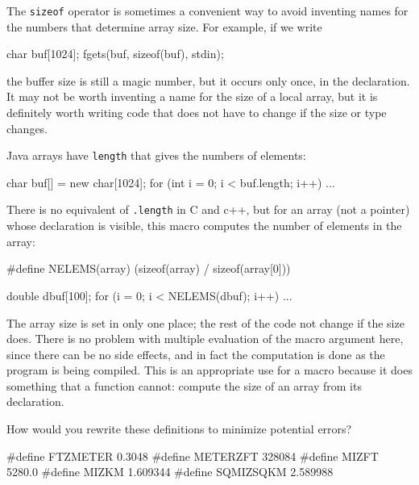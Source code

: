 The \verb'sizeof' operator is sometimes a convenient way to avoid inventing
names for the numbers that determine array size. For example, if we write 
\begin{wellcode}
    char    buf[1024];
    fgets(buf, sizeof(buf), stdin);
\end{wellcode}
the buffer size is still a magic number, but it occurs only once, in the
declaration. It may not be worth inventing a name for the size of a local
array, but it is definitely worth writing code that does not have to change
if the size or type changes.

Java arrays have \verb'length' that gives the numbers of elements:
\begin{wellcode}
    char buf[] = new char[1024];
    for (int i = 0; i < buf.length; i++)
        ...
\end{wellcode}

There is no equivalent of \verb'.length' in C and c++, but for an array
(not a pointer) whose declaration is visible, this macro computes the
number of elements in the array:
\begin{wellcode}
    #define NELEMS(array) (sizeof(array) / sizeof(array[0]))

    double dbuf[100];
    for (i = 0; i < NELEMS(dbuf); i++)
        ...
\end{wellcode}
The array size is set in only one place; the rest of the code not change if
the size does. There is no problem with multiple evaluation of the macro
argument here, since there can be no side effects, and in fact the
computation is done as the program is being compiled. This is an
appropriate use for a macro because it does something that a function
cannot: compute the size of an array from its declaration.

\begin{exercise}
    How would you rewrite these definitions to minimize potential errors?
    \begin{badcode}
        #define FTZMETER    0.3048
        #define METERZFT    328084
        #define MIZFT       5280.0
        #define MIZKM       1.609344
        #define SQMIZSQKM   2.589988
    \end{badcode}
\end{exercise}
